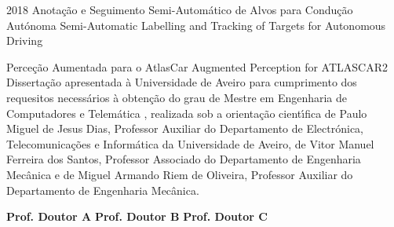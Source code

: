 \documentclass[11pt,twoside,a4paper]{report}
\def\ThesisYear{2018}
\begin{document}
%
%

\TitlePage
         {\ThesisYear}
        {Anota\c c\~ ao e Seguimento Semi-Autom\'atico de Alvos para Condu\c c\~ ao Aut\'onoma \newline Semi-Automatic Labelling and Tracking of Targets for Autonomous Driving}
\EndTitlePage
\titlepage\ \endtitlepage %

%
%

\TitlePage
  \HEADER{}{\ThesisYear}
        {Perce\c c\~ao Aumentada para o AtlasCar \newline Augmented Perception for ATLASCAR2}
  \vspace*{15mm}
  \TEXT{}
       {Disserta\c c\~ao apresentada \`a Universidade de Aveiro para cumprimento dos requesitos
        necess\'arios \`a obten\c c\~ao do grau de Mestre em Engenharia de Computadores e Telem\'atica , realizada sob a orienta\c c\~ao
        cient\'\i fica de Paulo Miguel de Jesus Dias, Professor Auxiliar do Departamento de Electr\'onica, Telecomunica\c c\~oes e Inform\'atica da Universidade de Aveiro, de Vitor Manuel Ferreira dos Santos, Professor Associado do Departamento de Engenharia Mec\^ anica e de Miguel Armando Riem de Oliveira, Professor Auxiliar do Departamento de Engenharia Mec\^ anica.}
\EndTitlePage
\titlepage\ \endtitlepage %

\TitlePage
  \vspace*{55mm}
       {}
       {\textbf{Prof. Doutor A}}
  \vspace*{5mm}
       {\textbf{Prof. Doutor B}}
  \vspace*{5mm}
  \TEXT{}
       {\textbf{Prof. Doutor C}}
\EndTitlePage
\titlepage\ \endtitlepage %
\end{document}
